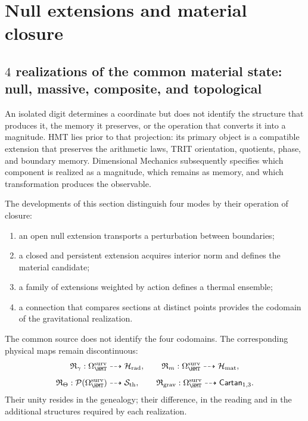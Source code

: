 \chapter{Null extensions and material closure}
\label{chap:realizaciones-nula-material}

\section{\(4\) realizations of the common material state: null, massive, composite, and topological}
\label{sec:cuatro-modos-realizacion}

An isolated digit determines a coordinate but does not identify the structure
that produces it, the memory it preserves, or the operation that converts it into
a magnitude. HMT lies prior to that projection: its primary object is a
compatible extension that preserves the arithmetic laws, TRIT orientation,
quotients, phase, and boundary memory. Dimensional Mechanics
subsequently specifies which component is realized as a magnitude, which remains
as memory, and which transformation produces the observable.

The developments of this section distinguish four modes by their operation of
closure:
\begin{enumerate}
 \item an open null extension transports a perturbation between
 boundaries;
 \item a closed and persistent extension acquires interior norm and defines
 the material candidate;
 \item a family of extensions weighted by action defines a thermal
 ensemble;
 \item a connection that compares sections at distinct points provides the
 codomain of the gravitational realization.
\end{enumerate}
The common source does not identify the four codomains. The corresponding
physical maps remain discontinuous:
\[
 \mathfrak R_\gamma:
 \Omega_{\HMT}^{\rm surv}\dashrightarrow\mathcal H_{\rm rad},
 \qquad
 \mathfrak R_m:
 \Omega_{\HMT}^{\rm surv}\dashrightarrow\mathcal H_{\rm mat},
\]
\[
 \mathfrak R_\Theta:
 \mathcal P(\Omega_{\HMT}^{\rm surv})\dashrightarrow\mathcal S_{\rm th},
 \qquad
 \mathfrak R_{\rm grav}:
 \Omega_{\HMT}^{\rm surv}\dashrightarrow\mathsf{Cartan}_{1,3}.
\]
Their unity resides in the genealogy; their difference, in the reading and in the
additional structures required by each realization.

